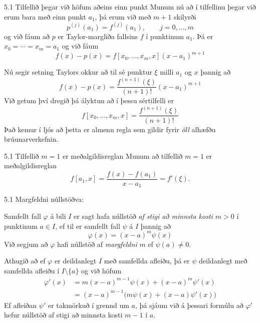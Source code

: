 \begin{frame}{5.1 Tilfellið þegar við höfum aðeins einn punkt} 
Munum nú að í tilfellinu þegar við erum bara með einn punkt 
$a_1$, þá erum við með $m+1$ skilyrði 
$$p^{(j)}(a_1)=f^{(j)}(a_1), \qquad j=0,\dots,m
$$
og við fáum að $p$ er Taylor-margliða fallsins $f$ í punktinum $a_1$.
Þá er $x_0=\cdots=x_m=a_1$ og við fáum
\begin{equation*}
  f(x) - p(x) 
  = f[x_0,\ldots,x_m,x](x-a_1)^{m+1}
\end{equation*} 

\pause
Nú segir setning Taylors okkur að til sé punktur $\xi$ milli $a_1$ og
$x$ þannig að 
$$
  f(x) - p(x) 
  = \dfrac{f^{(n+1)}(\xi)}{(n+1)!}(x-a_1)^{m+1}
$$
Við getum því dregið þá ályktun að í þessu sértilfelli er
$$
f[x_0,\ldots,x_m,x]=\dfrac{f^{(n+1)}(\xi)}{(n+1)!}
$$
Það kemur í ljós að þetta er almenn regla sem gildir
fyrir {\it öll} alhæfðu brúunarverkefnin.
\end{frame}

\begin{frame}{5.1 Tilfellið $m=1$ er meðalgildisreglan} 
Munum að tilfellið $m=1$ er meðalgildisreglan
$$
f[a_1,x]=\dfrac{f(x)-f(a_1)}{x-a_1}=f'(\xi).
$$
\end{frame}

\begin{frame}{5.1 Margfeldni núllstöðva:} 

Samfellt fall $\varphi$ á bili $I$ er sagt hafa núllstöð {\it af stigi 
að minnsta kosti $m>0$} í punktinum $a\in I$, ef til er samfellt fall 
$\psi$ á $I$ þannig að 
$$
\varphi(x)=(x-a)^m\psi(x)
$$   
Við segjum að $\varphi$ hafi núllstöð af {\it margfeldni} $m$ ef
$\psi(a)\neq0$.

\pause
\smallskip
Athugið að ef $\varphi$ er deildanlegt  $I$ með samfellda afleiðu, 
þá er $\psi$ deildanlegt með samfellda afleiðu í $I\setminus\{a\}$ og 
við höfum
\begin{align*}
  \varphi'(x)&=m(x-a)^{m-1}\psi(x)+(x-a)^m\psi'(x)\\
&= (x-a)^{m-1} \big(m\psi(x)+(x-a)\psi'(x)\big)
\end{align*}
Ef afleiðan $\psi'$ er takmörkuð í grennd um $a$, þá sjáum við á
þessari formúlu að 
$\varphi'$ hefur núllstöð af stigi að minnsta kosti $m-1$ í $a$.
\end{frame}

